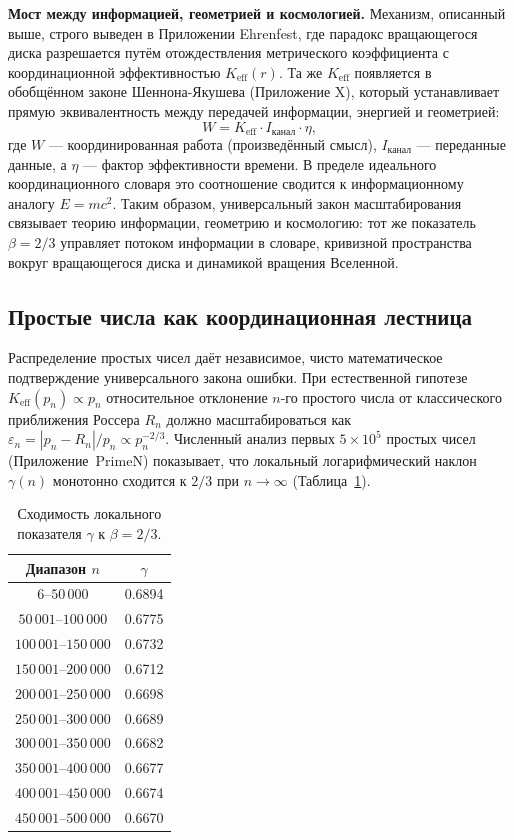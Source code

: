 \documentclass[12pt]{article}
\begin{document}
	\textbf{Мост между информацией, геометрией и космологией.}
	Механизм, описанный выше, строго выведен в Приложении Ehrenfest, где парадокс вращающегося диска разрешается путём отождествления метрического коэффициента с координационной эффективностью \(K_{\mathrm{eff}}(r)\). Та же \(K_{\mathrm{eff}}\) появляется в обобщённом законе Шеннона-Якушева (Приложение X), который устанавливает прямую эквивалентность между передачей информации, энергией и геометрией:
	\begin{equation}
		W = K_{\mathrm{eff}} \cdot I_{\text{канал}} \cdot \eta,
	\end{equation}
	где \(W\) — координированная работа (произведённый смысл), \(I_{\text{канал}}\) — переданные данные, а \(\eta\) — фактор эффективности времени. В пределе идеального координационного словаря это соотношение сводится к информационному аналогу \(E = mc^2\). Таким образом, универсальный закон масштабирования связывает теорию информации, геометрию и космологию: тот же показатель \(\beta = 2/3\) управляет потоком информации в словаре, кривизной пространства вокруг вращающегося диска и динамикой вращения Вселенной.
	
	\subsection{Простые числа как координационная лестница}
	
	Распределение простых чисел даёт независимое, чисто математическое подтверждение универсального закона ошибки. При естественной гипотезе \(K_{\mathrm{eff}}(p_n) \propto p_n\) относительное отклонение \(n\)-го простого числа от классического приближения Россера \(R_n\) должно масштабироваться как \(\varepsilon_n = |p_n - R_n|/p_n \propto p_n^{-2/3}\). Численный анализ первых \(5\times10^5\) простых чисел (Приложение~PrimeN) показывает, что локальный логарифмический наклон \(\gamma(n)\) монотонно сходится к \(2/3\) при \(n\to\infty\) (Таблица~\ref{tab:prime-slopes}).
	
	\begin{table}[H]
		\centering
		\caption{Сходимость локального показателя \(\gamma\) к \(\beta = 2/3\).}
		\label{tab:prime-slopes}
		\begin{tabular}{c c}
			\toprule
			Диапазон \(n\) & \(\gamma\) \\
			\midrule
			\(6\)--\(50\,000\)    & 0.6894 \\
			\(50\,001\)--\(100\,000\) & 0.6775 \\
			\(100\,001\)--\(150\,000\)& 0.6732 \\
			\(150\,001\)--\(200\,000\)& 0.6712 \\
			\(200\,001\)--\(250\,000\)& 0.6698 \\
			\(250\,001\)--\(300\,000\)& 0.6689 \\
			\(300\,001\)--\(350\,000\)& 0.6682 \\
			\(350\,001\)--\(400\,000\)& 0.6677 \\
			\(400\,001\)--\(450\,000\)& 0.6674 \\
			\(450\,001\)--\(500\,000\)& 0.6670 \\
			\bottomrule
		\end{tabular}
	\end{table}
	
\end{document}

